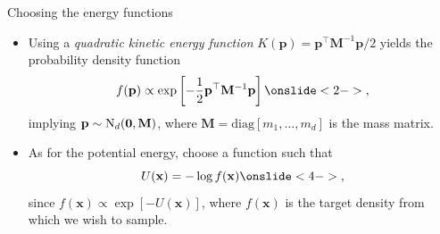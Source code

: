 \documentclass[]{beamer}\usepackage[]{graphicx}\usepackage[]{color}
\newcommand{\N}{\text{\normalfont N}}
\begin{document}
\begin{frame}{Choosing the energy functions}
	\begin{itemize}
		\item Using a \textit{quadratic kinetic energy function} $K(\mathbf p) = \mathbf p^\top \mathbf M^{-1} \mathbf p / 2$ yields the probability density function
		\begin{align*}
			f(\mathbf p) \propto \exp \left[ -\frac{1}{2} \mathbf p^\top \mathbf M^{-1} \mathbf p \right] \onslide<2->{,}
		\end{align*}
		\pause
		implying $\mathbf p \sim \N_d(\mathbf 0, \mathbf M)$, where $\mathbf M = \text{diag}[m_1, \dots, m_d]$ is the mass matrix.

		\pause
		\item As for the potential energy, choose a function such that
		\[
			 U(\mathbf x) = -\log f(\mathbf x) \onslide<4->{,}
		\]
		\pause
		since $f(\mathbf x) \propto \exp [ - U( \mathbf x)]$, where $f(\mathbf x)$ is the target density from which we wish to sample.

	\end{itemize}
\end{frame}
\end{document}
